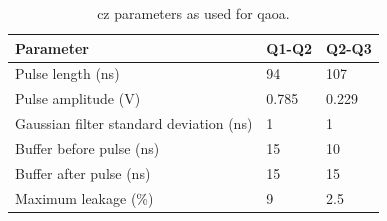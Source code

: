 \begin{table}[ht]
\centering
\caption{\gls{cz} parameters as used for \gls{qaoa}.}
\begin{tabularx}{\textwidth}{lll}
\toprule
Parameter & \textbf{Q1}-\textbf{Q2} & \textbf{Q2}-\textbf{Q3}   \\ 
\midrule
Pulse length (ns) & 94 &  107 \\
Pulse amplitude (V)  & 0.785 & 0.229  \\
Gaussian filter standard deviation (ns) & 1 & 1  \\ %
Buffer before pulse (ns) & 15 & 10  \\
Buffer after pulse (ns) & 15 & 15 \\
Maximum leakage (\%) & 9 & 2.5  \\
\bottomrule
\end{tabularx}
\label{tab:cz_gate_params}
\end{table}
